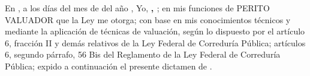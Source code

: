 
En  \lugarInforme{}, a los \numberstringnum{\diainforme} d\'ias del mes de \monthname[\mesinforme] del a\~no \numberstringnum{\annoinforme}, Yo, \textbf{\textcolor{principal}{\nombrePerito, \descripcionPerito}}; en mis funciones de PERITO VALUADOR que la Ley  me otorga; con base en mis conocimientos t\'ecnicos y mediante la aplicaci\'on de t\'ecnicas de valuaci\'on, seg\'un lo dispuesto por el art\'iculo 6, fracci\'on II y dem\'as relativos de la Ley Federal de Corredur\'ia P\'ublica; art\'iculos 6, segundo p\'arrafo, 56 Bis del Reglamento de la Ley Federal de Corredur\'ia P\'ublica; expido a continuaci\'on el presente dictamen de \tipoAvaluo.

